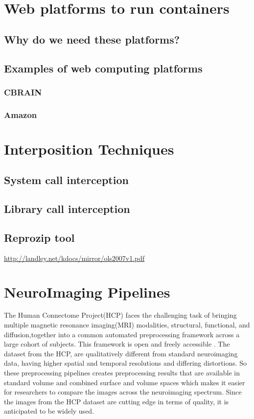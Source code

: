\section{Web platforms to run containers}
\subsection{Why do we need these platforms?}
\subsection{Examples of web computing platforms}
\subsubsection{CBRAIN}
\subsubsection{Amazon}

\section{Interposition Techniques}
\subsection{System call interception}
\subsection{Library call interception}
\subsection{Reprozip tool}
\hyperref[System Call Interception]{http://landley.net/kdocs/mirror/ols2007v1.pdf}

\section{NeuroImaging Pipelines}
The Human Connectome Project(HCP) faces the challenging task of bringing multiple magnetic resonance imaging(MRI) modalities, structural, functional, and diffusion,together into a common automated preprocessing framework across a large cohort of subjects. This framework is open and freely accessible \cite{Gla13}. The dataset from the HCP, are qualitatively different from standard neuroimaging data, having higher spatial and temporal resolutions and differing distortions. So these preprocessing pipelines creates preprocessing results that are available in standard volume and combined surface and volume spaces which makes it easier for researchers to compare the images across the neuroimaging spectrum. Since the images from the HCP dataset are cutting edge in terms of quality, it is anticipated to be widely used.

